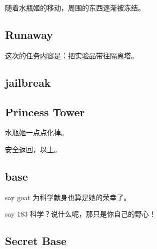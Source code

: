 \documentclass{article}
\begin{document}
随着水瓶姬的移动，周围的东西逐渐被冻结。

\subsection{Runaway}

这次的任务内容是：把实验品带往隔离塔。

\subsection{jailbreak}

\subsection{Princess Tower}

水瓶姬一点点化掉。

安全返回，以上。

\subsection{base}

say goat 为科学献身也算是她的荣幸了。

say 183 科学？说什么呢，那只是你自己的野心！

\subsection{Secret Base}
\end{document}
